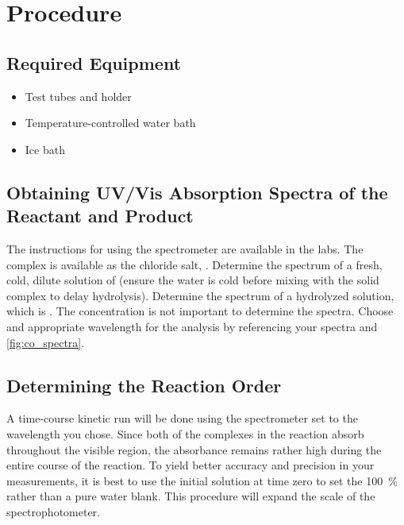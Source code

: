 \section{Procedure}
\label{sec:procedure}

\subsection{Required Equipment}
\label{subs:req_equip}

\begin{itemize}
	\item Test tubes and holder
	\item Temperature-controlled water bath
	\item Ice bath
\end{itemize}

\subsection{Obtaining UV/Vis Absorption Spectra of the Reactant and Product}

The instructions for using the spectrometer are available in the labs. 
The  complex is available as the chloride salt, . Determine the spectrum of a fresh, cold, dilute solution of  (ensure the water is cold before mixing with the solid complex to delay hydrolysis). 
Determine the spectrum of a hydrolyzed solution, which is . 
The concentration is not important to determine the spectra. 
Choose and appropriate wavelength for the analysis by referencing your spectra and \cref{fig:co_spectra}. 

\subsection{Determining the Reaction Order} 

A time-course kinetic run will be done using the spectrometer set to the wavelength you chose. 
Since both of the complexes in the reaction absorb throughout the visible region, the absorbance remains rather high during the entire course of the reaction. 
To yield better accuracy and precision in your measurements, it is best to use the initial solution at time zero to set the \qty{100}{\percent} rather than a pure water blank. 
This procedure will expand the scale of the spectrophotometer. 

